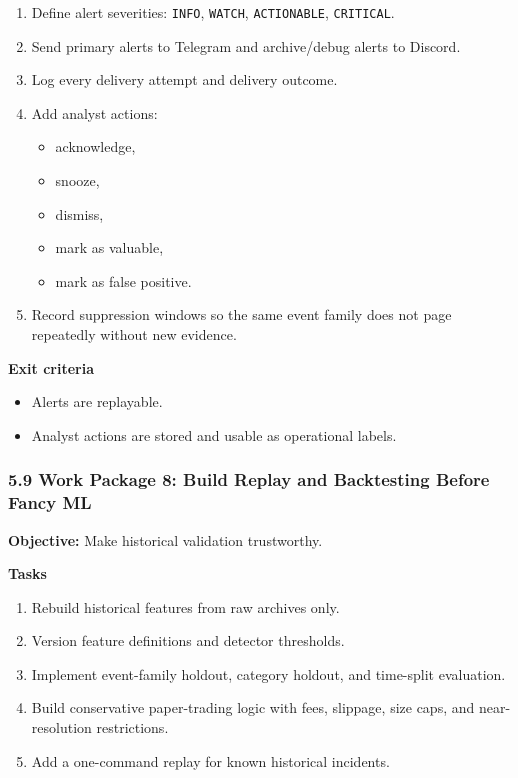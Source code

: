 \documentclass[
]{article}
\providecommand{\tightlist}{%
  \setlength{\itemsep}{0pt}\setlength{\parskip}{0pt}}
\begin{document}
\begin{enumerate}
\def\labelenumi{\arabic{enumi}.}
\tightlist
\item
  Define alert severities: \texttt{INFO}, \texttt{WATCH},
  \texttt{ACTIONABLE}, \texttt{CRITICAL}.
\item
  Send primary alerts to Telegram and archive/debug alerts to Discord.
\item
  Log every delivery attempt and delivery outcome.
\item
  Add analyst actions:

  \begin{itemize}
  \tightlist
  \item
    acknowledge,
  \item
    snooze,
  \item
    dismiss,
  \item
    mark as valuable,
  \item
    mark as false positive.
  \end{itemize}
\item
  Record suppression windows so the same event family does not page
  repeatedly without new evidence.
\end{enumerate}

\textbf{Exit criteria}

\begin{itemize}
\tightlist
\item
  Alerts are replayable.
\item
  Analyst actions are stored and usable as operational labels.
\end{itemize}

\subsubsection{5.9 Work Package 8: Build Replay and Backtesting Before
Fancy
ML}\label{59-work-package-8-build-replay-and-backtesting-before-fancy-ml}

\textbf{Objective:} Make historical validation trustworthy.

\textbf{Tasks}

\begin{enumerate}
\def\labelenumi{\arabic{enumi}.}
\tightlist
\item
  Rebuild historical features from raw archives only.
\item
  Version feature definitions and detector thresholds.
\item
  Implement event-family holdout, category holdout, and time-split
  evaluation.
\item
  Build conservative paper-trading logic with fees, slippage, size caps,
  and near-resolution restrictions.
\item
  Add a one-command replay for known historical incidents.
\end{enumerate}
\end{document}
